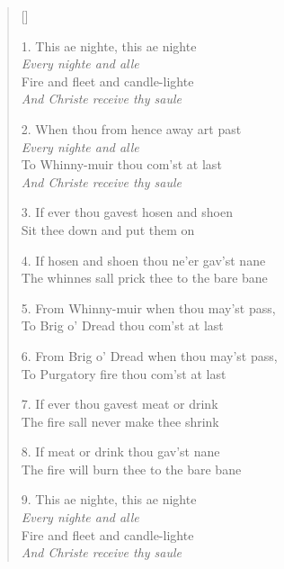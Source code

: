 \begin{verse}[\versewidth]

\begin{altverse}
1. This ae nighte, this ae nighte\\
    \emph{Every nighte and alle}\\
Fire and fleet and candle-lighte\\
    \emph{And Christe receive thy saule}
\end{altverse}

\begin{altverse}
2. When thou from hence away art past\\
    \emph{Every nighte and alle}\\
To Whinny-muir thou com'st at last\\
    \emph{And Christe receive thy saule}
\end{altverse}

3. If ever thou gavest hosen and shoen\\
Sit thee down and put them on


4. If hosen and shoen thou ne'er gav'st nane\\
The whinnes sall prick thee to the bare bane

5. From Whinny-muir when thou may'st pass,\\
To Brig o' Dread thou com'st at last

6. From Brig o' Dread when thou may'st pass,\\
To Purgatory fire thou com'st at last

7. If ever thou gavest meat or drink\\
The fire sall never make thee shrink

8. If meat or drink thou gav'st nane\\
The fire will burn thee to the bare bane

\begin{altverse}
9. This ae nighte, this ae nighte\\
    \emph{Every nighte and alle}\\
Fire and fleet and candle-lighte\\
    \emph{And Christe receive thy saule}
\end{altverse}



\end{verse}
